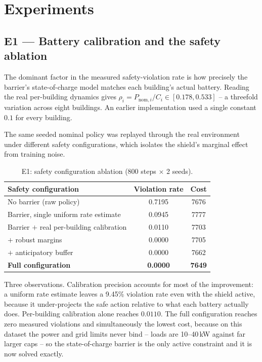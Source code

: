 \documentclass[11pt]{article}
\begin{document}
\section{Experiments}
\label{sec:experiments}

\subsection{E1 --- Battery calibration and the safety ablation}
\label{sec:exp-battery}

The dominant factor in the measured safety-violation rate is how precisely the
barrier's state-of-charge model matches each building's actual battery. Reading
the real per-building dynamics gives
$\rho_i = P_{\text{nom},i}/C_i \in [0.178, 0.533]$ -- a threefold variation across
eight buildings. An earlier implementation used a single constant $0.1$ for
every building.

The same seeded nominal policy was replayed through the real environment under
different safety configurations, which isolates the shield's marginal effect
from training noise.

\begin{table}[h]
\centering
\caption{E1: safety configuration ablation (800 steps $\times$ 2 seeds).}
\label{tab:ablation}
\begin{tabular}{lcc}
\toprule
Safety configuration & Violation rate & Cost \\
\midrule
No barrier (raw policy) & 0.7195 & 7676 \\
Barrier, single uniform rate estimate & 0.0945 & 7777 \\
Barrier $+$ real per-building calibration & 0.0110 & 7703 \\
\quad $+$ robust margins & 0.0000 & 7705 \\
\quad $+$ anticipatory buffer & 0.0000 & 7662 \\
\textbf{Full configuration} & \textbf{0.0000} & \textbf{7649} \\
\bottomrule
\end{tabular}
\end{table}

Three observations. Calibration precision accounts for most of the improvement:
a uniform rate estimate leaves a 9.45\% violation rate even with the shield
active, because it under-projects the safe action relative to what each battery
actually does. Per-building calibration alone reaches $0.0110$. The full
configuration reaches zero measured violations and simultaneously the lowest
cost, because on this dataset the power and grid limits never bind -- loads are
10--40\,kW against far larger caps -- so the state-of-charge barrier is the only
active constraint and it is now solved exactly.
\end{document}
